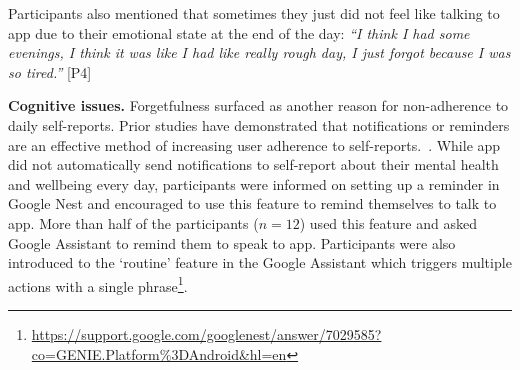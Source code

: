         Participants also mentioned  that sometimes they just did not feel like talking to \acl{app} due to their emotional state at the end of the day:
                \textit{
                ``I think I had some evenings, I think it was like I had like really rough day, I just forgot because I was so tired.''
                }
                [P4]
        
         
        \textbf{Cognitive issues. }
        Forgetfulness surfaced as another reason for non-adherence to daily self-reports. Prior studies have demonstrated that notifications or reminders are an effective method of increasing user adherence to self-reports.~\cite{moller2013investigating, hofmann2015surveysignal}. While \acl{app} did not automatically send notifications to self-report about their mental health and wellbeing every day, participants were informed on setting up a reminder in Google Nest and encouraged to use this feature to remind themselves to talk to \acl{app}. More than half of the participants ($n=12$) used this feature and asked Google Assistant to remind them to speak to \acl{app}.
        Participants were also introduced to the `routine' feature in the Google Assistant which triggers multiple actions with a single phrase\footnote{\url{https://support.google.com/googlenest/answer/7029585?co=GENIE.Platform\%3DAndroid&hl=en}}. 
        
